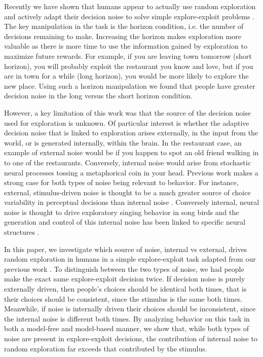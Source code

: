 \documentclass[12pt]{article}
\begin{document}
	Recently we have shown that humans appear to actually use random exploration and actively adapt their decision noise to solve simple explore-exploit problems \citep{wilson2014}.  The key manipulation in the task is the horizon condition, i.e. the number of decisions remaining to make. Increasing the horizon makes exploration more valuable as there is more time to use the information gained by exploration to maximize future rewards. For example, if you are leaving town tomorrow (short horizon), you will probably exploit the restaurant you know and love, but if you are in town for a while (long horizon), you would be more likely to explore the new place. Using such a horizon manipulation we found that people have greater decision noise in the long versus the short horizon condition. 
	
	
	However, a key limitation of this work was that the source of the decision noise used for exploration is unknown. Of particular interest is whether the adaptive decision noise that is linked to exploration arises externally, in the input from the world, or is generated internally, within the brain. In the restaurant case, an example of external noise would be if you happen to spot an old friend walking in to one of the restaurants. Conversely, internal noise would arise from stochastic neural processes tossing a metaphorical coin in your head. Previous work makes a strong case for both types of noise being relevant to behavior. For instance, external, stimulus-driven noise is thought to be a much greater source of choice variability in perceptual decisions than internal noise \citep{eeBrunton13}. Conversely internal, neural noise is thought to drive exploratory singing behavior in song birds  \citep{songbird2} and the generation and control of this internal noise has been linked to specific neural structures \citep{songbird2}. 
	
	In this paper, we investigate which source of noise, internal vs external, drives random exploration in humans in a simple explore-exploit task adapted from our previous work \citep{wilson2014}. To distinguish between the two types of noise, we had people make the exact same explore-exploit decision twice. If decision noise is purely externally driven, then people's choices should be identical both times, that is their choices should be consistent, since the stimulus is the same both times. Meanwhile, if noise is internally driven their choices should be inconsistent, since the internal noise is different both times. By analyzing behavior on this task in both a model-free and model-based manner, we show that, while both types of noise are present in explore-exploit decisions, the contribution of internal noise to random exploration far exceeds that contributed by the stimulus.
	
\end{document}
